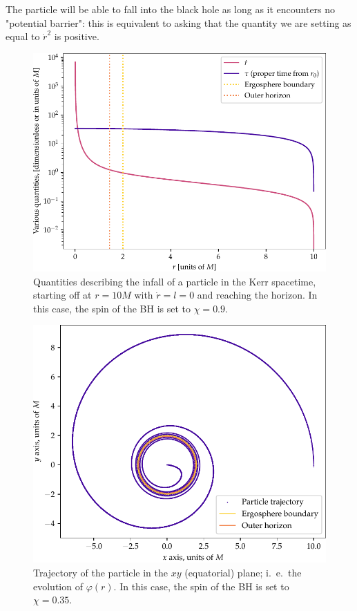 \documentclass[main.tex]{subfiles}
\begin{document}
The particle will be able to fall into the black hole as long as it encounters no "potential barrier": this is equivalent to asking that the quantity we are setting as equal to \(\dot{r}^2\) is positive.

\begin{figure}[ht]
\centering
\includegraphics[width=.9\textwidth]{figures/kerr_infall}
\caption{Quantities describing the infall of a particle in the Kerr spacetime, starting off at \(r = 10M\) with \(\dot{r} = l = 0\) and reaching the horizon. In this case, the spin of the BH is set to \(\chi = 0.9\).}
\label{fig:kerr_infall}
\end{figure}

\begin{figure}[ht]
\centering
\includegraphics[width=.9\textwidth]{figures/kerr_trajectory}
\caption{Trajectory of the particle in the \(xy\) (equatorial) plane; i.\ e.\ the evolution of \(\varphi (r)\). In this case, the spin of the BH is set to \(\chi = 0.35\).}
\label{fig:kerr_trajectory}
\end{figure}
    
\end{document}
